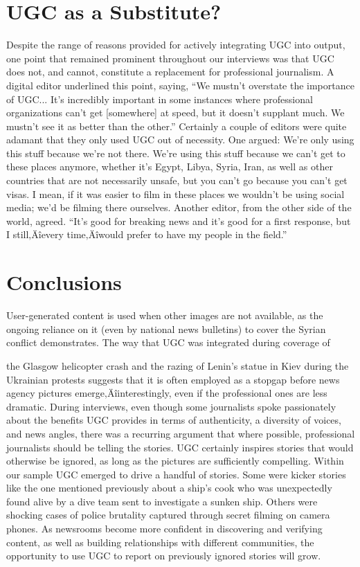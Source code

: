 \documentclass[symmetric, notoc, nobib]{towcenter-book}
\begin{document}
\section{UGC as a Substitute?}
Despite the range of reasons provided for actively integrating UGC into
output, one point that remained prominent throughout our interviews was
that UGC does not, and cannot, constitute a replacement for professional
journalism. A digital editor underlined this point, saying, ``We mustn't overstate
the importance of UGC... It's incredibly important in some instances
where professional organizations can't get [somewhere] at speed, but it
doesn't supplant much. We mustn't see it as better than the other.''
Certainly a couple of editors were quite adamant that they only used UGC
out of necessity. One argued:
We're only using this stuff because we're not there. We're using this
stuff because we can't get to these places anymore, whether it's Egypt,
Libya, Syria, Iran, as well as other countries that are not necessarily
unsafe, but you can't go because you can't get visas. I mean, if it was
easier to film in these places we wouldn't be using social media; we'd
be filming there ourselves.
Another editor, from the other side of the world, agreed. ``It's good for breaking
news and it's good for a first response, but I still‚Äîevery time‚Äîwould
prefer to have my people in the field.''
\section{Conclusions}
User-generated content is used when other images are not available, as the
ongoing reliance on it (even by national news bulletins) to cover the Syrian
conflict demonstrates. The way that UGC was integrated during coverage of

the Glasgow helicopter crash and the razing of Lenin's statue in Kiev during
the Ukrainian protests suggests that it is often employed as a stopgap before
news agency pictures emerge‚Äîinterestingly, even if the professional ones
are less dramatic. During interviews, even though some journalists spoke
passionately about the benefits UGC provides in terms of authenticity, a
diversity of voices, and news angles, there was a recurring argument that
where possible, professional journalists should be telling the stories.
UGC certainly inspires stories that would otherwise be ignored, as long as
the pictures are sufficiently compelling. Within our sample UGC emerged
to drive a handful of stories. Some were kicker stories like the one mentioned
previously about a ship's cook who was unexpectedly found alive by
a dive team sent to investigate a sunken ship. Others were shocking cases
of police brutality captured through secret filming on camera phones. As
newsrooms become more confident in discovering and verifying content, as
well as building relationships with different communities, the opportunity
to use UGC to report on previously ignored stories will grow.
\end{document}
